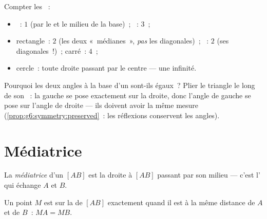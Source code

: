 \begin{example}\label{ex:g6:symmetry:shapes}
Compter les ~:
\begin{itemize}
  \item {}~: $1$ (par le  et le milieu de la
        base)~; ~: $3$~;
  \item rectangle~: $2$ (les deux «~médianes~», \emph{pas} les
        diagonales)~; ~: $2$ (ses diagonales~!)~; carré~: $4$~;
  \item cercle~: toute droite passant par le centre --- une infinité.
\end{itemize}
\end{example}

\begin{example}\label{ex:g6:symmetry:proves}
Pourquoi les deux angles à la base d'un  sont-ils
égaux~? Plier le triangle le long de son ~: la 
gauche se pose exactement sur la  droite, donc l'angle de gauche
se pose sur l'angle de droite --- ils doivent avoir la même mesure
(\cref{prop:g6:symmetry:preserved}~: les réflexions conservent les
angles).
\end{example}

\section{Médiatrice}

\begin{definition}[Médiatrice]\label{def:g6:symmetry:bisector}
La \emph{médiatrice} d'un  $[AB]$ est la
droite  à $[AB]$ passant par son milieu --- c'est l' qui échange $A$ et $B$.
\end{definition}

\begin{proposition}[Équidistance]\label{prop:g6:symmetry:bisector}
Un point $M$ est sur la  de $[AB]$ exactement quand il est
à la même distance de $A$ et de $B$~: $MA = MB$.
\end{proposition}
\admitted


